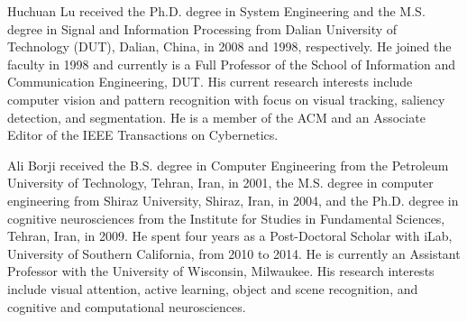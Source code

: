 \documentclass[journal]{IEEEtran}
\begin{document}
\begin{IEEEbiography}{Huchuan Lu}
received the Ph.D. degree in System Engineering and the M.S. degree in Signal and Information Processing from Dalian University of Technology (DUT), Dalian, China, in 2008 and 1998, respectively. He joined the faculty in 1998 and currently is a Full Professor of the School of Information and Communication Engineering, DUT. His current research interests include computer vision and pattern recognition with focus on visual tracking, saliency detection, and segmentation. He is a member of the ACM and an Associate Editor of the IEEE Transactions on Cybernetics.
\end{IEEEbiography}
\begin{IEEEbiography}{Ali Borji}
received the B.S. degree in Computer Engineering from the Petroleum University of Technology, Tehran, Iran, in 2001, the M.S. degree in computer engineering from Shiraz University, Shiraz, Iran, in 2004, and the Ph.D. degree in cognitive neurosciences from the Institute for Studies in Fundamental Sciences, Tehran, Iran, in 2009. He spent four years as a Post-Doctoral Scholar with iLab, University of Southern California, from 2010 to 2014. He is currently an Assistant Professor with the University of Wisconsin, Milwaukee. His research interests include visual attention, active learning, object and scene recognition, and cognitive and computational neurosciences. 
\end{IEEEbiography}
\end{document}
